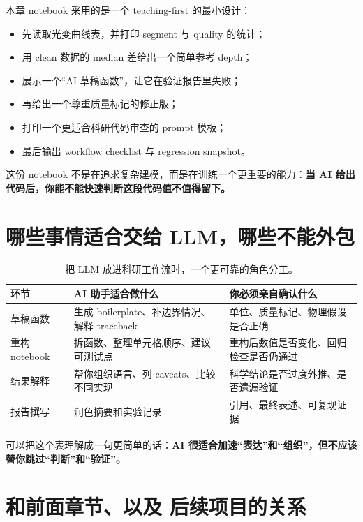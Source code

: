 本章 notebook 采用的是一个 teaching-first 的最小设计：

\begin{itemize}
    \item 先读取光变曲线表，并打印 segment 与 quality 的统计；
    \item 用 clean 数据的 median 差给出一个简单参考 depth；
    \item 展示一个“AI 草稿函数”，让它在验证报告里失败；
    \item 再给出一个尊重质量标记的修正版；
    \item 打印一个更适合科研代码审查的 prompt 模板；
    \item 最后输出 workflow checklist 与 regression snapshot。
\end{itemize}

这份 notebook 不是在追求复杂建模，而是在训练一个更重要的能力：\textbf{当 AI 给出代码后，你能不能快速判断这段代码值不值得留下。}

\section{哪些事情适合交给 LLM，哪些不能外包}

\begin{table}[htbp]
\centering
\small
\begin{tabular}{p{}p{}p{}}
\toprule
环节 & AI 助手适合做什么 & 你必须亲自确认什么 \\
\midrule
草稿函数 & 生成 boilerplate、补边界情况、解释 traceback & 单位、质量标记、物理假设是否正确 \\
重构 notebook & 拆函数、整理单元格顺序、建议可测试点 & 重构后数值是否变化、回归检查是否仍通过 \\
结果解释 & 帮你组织语言、列 caveats、比较不同实现 & 科学结论是否过度外推、是否遗漏验证 \\
报告撰写 & 润色摘要和实验记录 & 引用、最终表述、可复现证据 \\
\bottomrule
\end{tabular}
\caption{把 LLM 放进科研工作流时，一个更可靠的角色分工。}
\label{tab:ch35_llm_roles}
\end{table}

可以把这个表理解成一句更简单的话：\textbf{AI 很适合加速“表达”和“组织”，但不应该替你跳过“判断”和“验证”。}

\section{和前面章节、以及 后续项目的关系}

